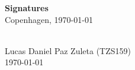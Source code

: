 \vspace{2em}
\begin{center}
    \textbf{Signatures}\\[0.5em]
    {\small Copenhagen, \today}
    \end{center}
    
    \vspace{2.5em}
    
    \noindent
    \begin{minipage}[t]{0.48\textwidth}
      \\[0.5em]
      Lucas Daniel Paz Zuleta (TZS159)\\
      {\small \today}
  \end{minipage}\hfill
    
    \vspace{7em}
    
    \noindent
